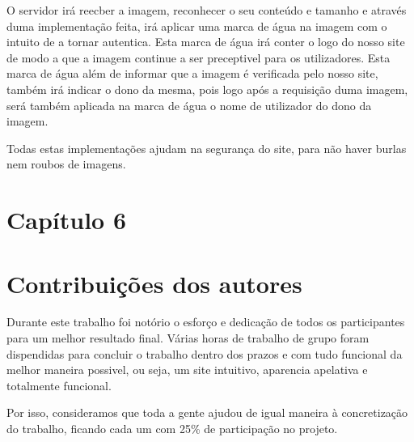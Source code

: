 \documentclass{report}
\begin{document}
O servidor irá reecber a imagem, reconhecer o seu conteúdo e tamanho e através duma implementação feita, irá aplicar uma marca de água na imagem com o intuito de a tornar autentica. Esta marca de água irá conter o logo do nosso site de modo a que a imagem continue a ser preceptivel para os utilizadores.
Esta marca de água além de informar que a imagem é verificada pelo nosso site, também irá indicar o dono da mesma, pois logo após a requisição duma imagem, será também aplicada na marca de água o nome de utilizador do dono da imagem.

Todas estas implementações ajudam na segurança do site, para não haver burlas nem roubos de imagens.


\section{Capítulo 6}
\section{Contribuições dos autores}
Durante este trabalho foi notório o esforço e dedicação de todos os participantes para um melhor resultado final. Várias horas de trabalho de grupo foram dispendidas para concluir o trabalho dentro dos prazos e com tudo funcional da melhor maneira possivel, ou seja, um site intuitivo, aparencia apelativa e totalmente funcional.

Por isso, consideramos que toda a gente ajudou de igual maneira à concretização do trabalho, ficando cada um com 25\% de participação no projeto.
\end{document}
